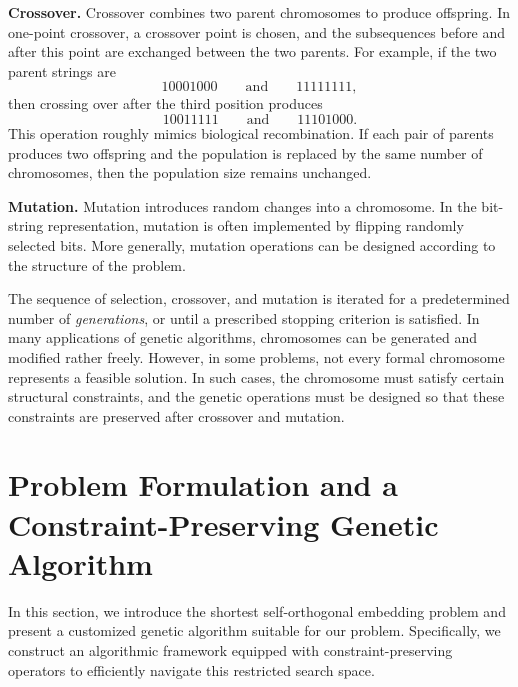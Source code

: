 \documentclass{article}
\begin{document}
\textbf{Crossover.}
Crossover combines two parent chromosomes to produce offspring. In one-point crossover, a crossover point is chosen, and the subsequences before and after this point are exchanged between the two parents. For example, if the two parent strings are
\[
10001000
\qquad\text{and}\qquad
11111111,
\]
then crossing over after the third position produces
\[
10011111
\qquad\text{and}\qquad
11101000.
\]
This operation roughly mimics biological recombination. If each pair of parents produces two offspring and the population is replaced by the same number of chromosomes, then the population size remains unchanged.

\textbf{Mutation.}
Mutation introduces random changes into a chromosome. In the bit-string representation, mutation is often implemented by flipping randomly selected bits. More generally, mutation operations can be designed according to the structure of the problem.

The sequence of selection, crossover, and mutation is iterated for a predetermined number of \textit{generations}, or until a prescribed stopping criterion is satisfied.
In many applications of genetic algorithms, chromosomes can be generated and modified rather freely. However, in some problems, not every formal chromosome represents a feasible solution. In such cases, the chromosome must satisfy certain structural constraints, and the genetic operations must be designed so that these constraints are preserved after crossover and mutation.

\section{Problem Formulation and a Constraint-Preserving Genetic Algorithm}
In this section, we introduce the shortest self-orthogonal embedding problem and present a customized genetic algorithm suitable for our problem. Specifically, we construct an algorithmic framework equipped with constraint-preserving operators to efficiently navigate this restricted search space.
\end{document}
